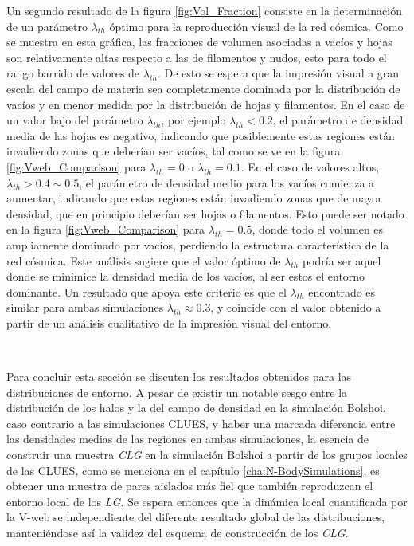Un segundo resultado de la figura \ref{fig:Vol_Fraction} consiste en la 
determinación de un parámetro $\lambda_{th}$ óptimo para la reproducción 
visual de la red cósmica. Como se muestra en esta gráfica, las fracciones
de volumen asociadas a vacíos y hojas son relativamente altas respecto a 
las de filamentos y nudos, esto para todo el rango barrido de valores de 
$\lambda_{th}$. De esto se espera que la impresión visual a gran escala
del campo de materia sea completamente dominada por la distribución de 
vacíos y en menor medida por la distribución de hojas y filamentos. En el 
caso de un valor bajo del parámetro $\lambda_{th}$, por ejemplo 
$\lambda_{th}<0.2$, el parámetro de densidad media de las hojas es negativo, 
indicando que posiblemente estas regiones están invadiendo zonas que deberían 
ser vacíos, tal como se ve en la figura \ref{fig:Vweb_Comparison} para 
$\lambda_{th} = 0$ o $\lambda_{th} = 0.1$. En el caso de valores altos, 
$\lambda_{th} > 0.4\sim 0.5$, el parámetro de densidad medio para los vacíos 
comienza a aumentar, indicando que estas regiones están invadiendo zonas
que de mayor densidad, que en principio deberían ser hojas o filamentos. 
Esto puede ser notado en la figura \ref{fig:Vweb_Comparison} para 
$\lambda_{th} = 0.5$, donde todo el volumen es ampliamente dominado por 
vacíos, perdiendo la estructura característica de la red cósmica. Este 
análisis sugiere que el valor óptimo de $\lambda_{th}$ podría ser aquel 
donde se minimice la densidad media de los vacíos, al ser estos el entorno
dominante. Un resultado que apoya este criterio es que el $\lambda_{th}$ 
encontrado es similar para ambas simulaciones $\lambda_{th}\approx 0.3$,
y coincide con el valor obtenido a partir de un análisis cualitativo de 
la impresión visual del entorno.

\

Para concluir esta sección se discuten los resultados obtenidos para las 
distribuciones de entorno. A pesar de existir un notable sesgo entre
la distribución de los halos y la del campo de densidad en la simulación 
Bolshoi, caso contrario a las simulaciones CLUES, y haber una marcada 
diferencia entre las densidades medias de las regiones en ambas 
simulaciones, la esencia de construir una muestra \textit{CLG} en la 
simulación Bolshoi a partir de los grupos locales de las CLUES, como se 
menciona en el capítulo \ref{cha:N-BodySimulations}, es obtener una muestra 
de pares aislados más fiel que también reproduzcan el entorno local de los 
\textit{LG}. Se espera entonces que la dinámica local cuantificada por la 
V-web se independiente del diferente resultado global de las distribuciones,
manteniéndose así la validez del esquema de construcción de los \textit{CLG}.



